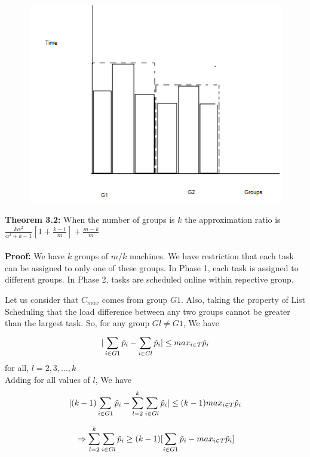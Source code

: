 \documentclass[10pt, conference, compsocconf]{IEEEtran}
\begin{document}
\begin{figure}[htp]
\centering
\includegraphics[width= 8 cm]{fig3}
\caption{}
\label{fig:fig3}
\end{figure}



\textbf{Theorem 3.2:} When the number of groups is $k$ the approximation ratio is $  \frac{k\alpha^{2}}{\alpha^{2}+k-1}[1+ {\frac{k-1}{m}} ]+ {\frac{m-k}{m}}   $ \\
\\
\textbf{Proof:} 
  We have $k$ groups of $m/k$ machines. We have restriction that each task can be assigned to only one of these groups. In Phase 1, each task is assigned to different groups. In Phase 2, tasks are scheduled online within repective group.

Let us consider  that $ C_{max}$ comes from group  $G1$. Also, taking the property of List Scheduling that the load difference between any two groups cannot be greater than the largest task. So, for any group $Gl \neq G1$, We have\\

\begin{equation}{\nonumber}
|\sum_{i \in G1 }^{}{\tilde p_{i}}- \sum_{i \in Gl }^{}{\tilde p_{i}}| \leq {max_{i \in T}}{\tilde p_{i}}\end{equation}  \hspace*{15pt}   for all, $l = 2,3,...,k$ \\

Adding for all values of $l$, We have \\

\begin{equation}{\nonumber}
|(k-1)\sum_{i \in G1 }^{}{\tilde p_{i}}- \sum_{l=2}^{k}\sum_{i \in Gl }^{}{\tilde p_{i}}| \leq (k-1) {max_{i \in T}}{\tilde p_{i}}
\end{equation}

\begin{equation}{\nonumber}
\Rightarrow \sum_{l=2}^{k}\sum_{i \in Gl }^{}{\tilde p_{i}} \geq (k-1)[\sum_{i \in G1 }^{}{\tilde p_{i}}- {max_{i \in T}}{\tilde p_{i}}]
\end{equation}
\end{document}

